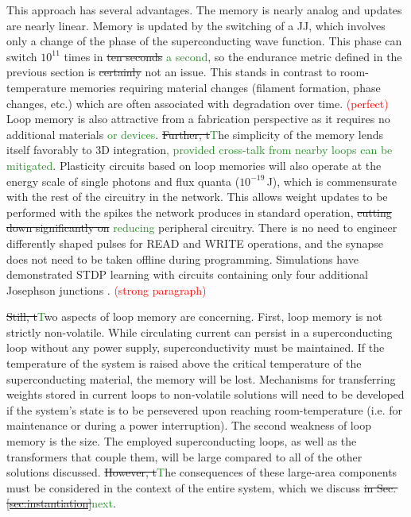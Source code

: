 \documentclass[twocolumn]{article}
\begin{document}
This approach has several advantages. The memory is nearly analog and updates are nearly linear. Memory is updated by the switching of a JJ, which involves only a change of the phase of the superconducting wave function. This phase can switch $10^{11}$ times in \sout{ten seconds} \textcolor{ForestGreen}{a second}, so the endurance metric defined in the previous section is \sout{certainly} not an issue. This stands in contrast to room-temperature memories requiring material changes (filament formation, phase changes, etc.) which are often associated with degradation over time. \textcolor{red}{(perfect)} Loop memory is also attractive from a fabrication perspective as it requires no additional materials \textcolor{ForestGreen}{or devices}. \sout{Further, t}\textcolor{ForestGreen}{T}he simplicity of the memory lends itself favorably to 3D integration\textcolor{ForestGreen}{, provided cross-talk from nearby loops can be mitigated}. Plasticity circuits based on loop memories will also operate at the energy scale of single photons and flux quanta ($10^{-19}$\,J), which is commensurate with the rest of the circuitry in the network. This allows weight updates to be performed with the spikes the network produces in standard operation, \sout{cutting down significantly on} \textcolor{ForestGreen}{reducing} peripheral circuitry. There is no need to engineer differently shaped pulses for READ and WRITE operations, and the synapse does not need to be taken offline during programming. Simulations have demonstrated STDP learning with circuits containing only four additional Josephson junctions \cite{shainline2019superconducting}. \textcolor{red}{(strong paragraph)}

\sout{Still, t}\textcolor{ForestGreen}{T}wo aspects of loop memory are concerning. First, loop memory is not strictly non-volatile. While circulating current can persist in a superconducting loop without any power supply, superconductivity must be maintained. If the temperature of the system is raised above the critical temperature of the superconducting material, the memory will be lost. Mechanisms for transferring weights stored in current loops to non-volatile solutions will need to be developed if the system's state is to be persevered upon reaching room-temperature (i.e. for maintenance or during a power interruption). The second weakness of loop memory is the size. The employed superconducting loops, as well as the transformers that couple them, will be large compared to all of the other solutions discussed. \sout{However, t}\textcolor{ForestGreen}{T}he consequences of these large-area components must be considered in the context of the entire system, which we discuss \sout{in Sec.\,\ref{sec:instantiation}}\textcolor{ForestGreen}{next}.
\end{document}
